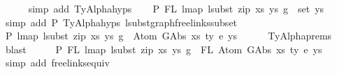 \begin{isabellebody}
\ \ \ \ \isamarkupfalse%
\ {\isacharparenleft}{\kern0pt}simp\ add{\isacharcolon}{\kern0pt}\ TyAlpha{\isachardot}{\kern0pt}hyps{\isacharparenleft}{\kern0pt}{}{\isacharparenright}{\kern0pt}{\isacharparenright}{\kern0pt}\isanewline
\ \ \isamarkupfalse%
\ P{}{\isacharcolon}{\kern0pt}\ {\isachardoublequoteopen}FL\ {\isacharparenleft}{\kern0pt}lmap\ {\isacharparenleft}{\kern0pt}lsubst\ {\isacharparenleft}{\kern0pt}zip\ xs{\isacharprime}{\kern0pt}\ ys{\isacharprime}{\kern0pt}{\isacharparenright}{\kern0pt}{\isacharparenright}{\kern0pt}\ g{\isacharparenright}{\kern0pt}\ {\isasymsubseteq}\ set\ ys{\isacharprime}{\kern0pt}{\isachardoublequoteclose}\isanewline
\ \ \ \ \isamarkupfalse%
\ {\isacharparenleft}{\kern0pt}simp\ add{\isacharcolon}{\kern0pt}\ P{}\ TyAlpha{\isachardot}{\kern0pt}hyps{\isacharparenleft}{\kern0pt}{}{\isacharcomma}{\kern0pt}{}{\isacharparenright}{\kern0pt}\ lsubst{\isacharunderscore}{\kern0pt}graph{\isacharunderscore}{\kern0pt}freelinks{\isacharunderscore}{\kern0pt}subset{\isacharparenright}{\kern0pt}\isanewline
\ \ \isamarkupfalse%
\ P{}{\isacharcolon}{\kern0pt}\ {\isachardoublequoteopen}lmap\ {\isacharparenleft}{\kern0pt}lsubst\ {\isacharparenleft}{\kern0pt}zip\ xs{\isacharprime}{\kern0pt}\ ys{\isacharprime}{\kern0pt}{\isacharparenright}{\kern0pt}{\isacharparenright}{\kern0pt}\ g\ {\isasymsimeq}\ Atom\ {\isacharparenleft}{\kern0pt}GAbs\ xs\ ty{}\ e{\isacharparenright}{\kern0pt}\ ys{\isachardoublequoteclose}\isanewline
\ \ \ \ \isamarkupfalse%
\ TyAlpha{\isachardot}{\kern0pt}prems{\isacharparenleft}{\kern0pt}{}{\isacharcomma}{\kern0pt}{}{\isacharparenright}{\kern0pt}\ \isamarkupfalse%
\ blast\isanewline
\ \ \isamarkupfalse%
\ \isamarkupfalse%
\ P{}{\isacharcolon}{\kern0pt}\ {\isachardoublequoteopen}FL\ {\isacharparenleft}{\kern0pt}lmap\ {\isacharparenleft}{\kern0pt}lsubst\ {\isacharparenleft}{\kern0pt}zip\ xs{\isacharprime}{\kern0pt}\ ys{\isacharprime}{\kern0pt}{\isacharparenright}{\kern0pt}{\isacharparenright}{\kern0pt}\ g{\isacharparenright}{\kern0pt}\ {\isacharequal}{\kern0pt}\ FL\ {\isacharparenleft}{\kern0pt}Atom\ {\isacharparenleft}{\kern0pt}GAbs\ xs\ ty{}\ e{\isacharparenright}{\kern0pt}\ ys{\isacharparenright}{\kern0pt}{\isachardoublequoteclose}\isanewline
\ \ \ \ \isamarkupfalse%
\ {\isacharparenleft}{\kern0pt}simp\ add{\isacharcolon}{\kern0pt}\ freelinks{\isacharunderscore}{\kern0pt}equiv{\isacharparenright}{\kern0pt}\isanewline

\end{isabellebody}
